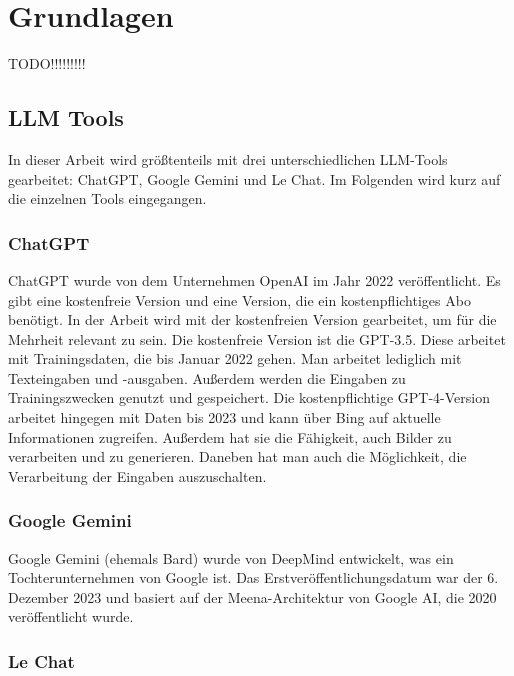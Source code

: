 
\chapter{Grundlagen} 

TODO!!!!!!!!!

\section{LLM Tools}  \label{LLM Tools}

In dieser Arbeit wird größtenteils mit drei unterschiedlichen LLM-Tools gearbeitet: ChatGPT, Google Gemini und  
Le Chat. Im Folgenden wird kurz auf die einzelnen Tools eingegangen.

\subsection{ChatGPT}  \label{ChatGPT}

ChatGPT wurde von dem Unternehmen OpenAI im Jahr 2022 veröffentlicht. Es gibt eine kostenfreie Version und  
eine Version, die ein kostenpflichtiges Abo benötigt. In der Arbeit wird mit der kostenfreien Version gearbeitet,  
um für die Mehrheit relevant zu sein. Die kostenfreie Version ist die GPT-3.5. Diese arbeitet mit Trainingsdaten,  
die bis Januar 2022 gehen. Man arbeitet lediglich mit Texteingaben und -ausgaben. Außerdem werden die Eingaben  
zu Trainingszwecken genutzt und gespeichert. Die kostenpflichtige GPT-4-Version arbeitet hingegen mit Daten  
bis 2023 und kann über Bing auf aktuelle Informationen zugreifen. Außerdem hat sie die Fähigkeit, auch Bilder  
zu verarbeiten und zu generieren. Daneben hat man auch die Möglichkeit, die Verarbeitung der Eingaben auszuschalten. 

\subsection{Google Gemini}  \label{Google Gemini}

Google Gemini (ehemals Bard) wurde von DeepMind entwickelt, was ein Tochterunternehmen von Google ist.  
Das Erstveröffentlichungsdatum war der 6. Dezember 2023 und basiert auf der Meena-Architektur von Google AI,  
die 2020 veröffentlicht wurde.

\subsection{Le Chat}  \label{Le Chat}

